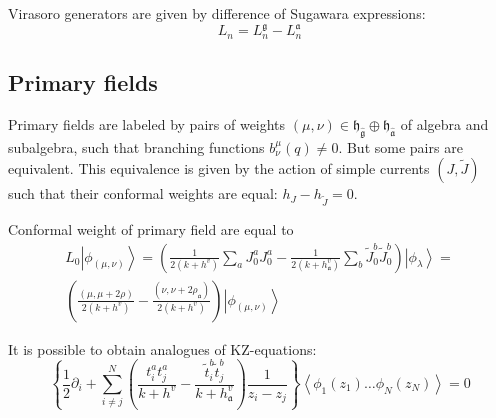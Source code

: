 \documentclass[12pt]{article}
\theoremstyle{definition}
\newcommand{\gf}{\mathfrak{g}}
\newcommand{\af}{\mathfrak{a}}
\newcommand{\hf}{\mathfrak{h}}
\newcommand{\gfh}{\hat{\mathfrak{g}}}
\newcommand{\afh}{\hat{\mathfrak{a}}}
\theoremstyle{definition} \newtheorem{Def}{Definition}
\begin{document}
Virasoro generators are given by difference of Sugawara expressions:
\begin{equation*}
  L_{n}=L_{n}^{\gf}-L_{n}^{\af}
\end{equation*}

\subsection{Primary fields}

Primary fields are labeled by pairs of weights $(\mu,\nu)\in \hf_{\gfh}\oplus \hf_{\afh}$  of algebra and subalgebra, such that branching functions $b^{\mu}_{\nu}(q)\neq 0$. But some pairs are equivalent. This equivalence is given by the action of simple currents $(J,\tilde{J})$ such that their conformal weights are equal:  $h_{J}-h_{\tilde{J}}=0$. 

Conformal weight of primary field are equal to
\begin{multline}
  L_0\left|\phi_{(\mu,\nu)}\right>=\left(\frac{1}{2(k+h^v)}\sum_aJ^a_0J^a_0-\frac{1}{2(k+h_{\af}^v)}\sum_b \tilde{J}^b_0 \tilde{J}^b_0 \right)
  \left|\phi_{\lambda}\right>=\\
  \left(\frac{(\mu,\mu+2\rho)}{2(k+h^v)}-\frac{(\nu,\nu+2\rho_{\af})}{2(k+h^v)}\right)\left|\phi_{(\mu,\nu)}\right>
\end{multline}


It is possible to obtain analogues of KZ-equations:
\begin{equation*}
  \left\{\frac{1}{2}\partial_{i} + \sum_{i\neq j}^{N}\left(\frac{t^{a}_{i}t^{a}_{j}}{k+h^{v}}-\frac{\tilde t^{b}_{i}\tilde t^{b}_{j}}{k+h^{v}_{\af}}\right)\frac{1}{z_{i}-z_{j}}\right\} \left<\phi_{1}(z_{1})\dots \phi_{N}(z_{N})\right>=0
\end{equation*}
\end{document}
